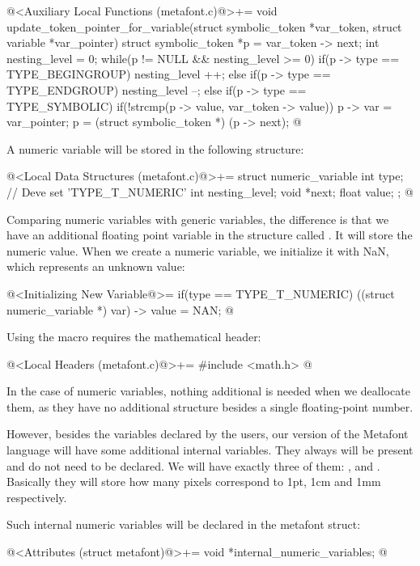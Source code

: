 \iniciocodigo
@<Auxiliary Local Functions (metafont.c)@>+=
void update_token_pointer_for_variable(struct symbolic_token *var_token,
                                      struct variable *var_pointer){
  struct symbolic_token *p = var_token -> next;
  int nesting_level = 0;
  while(p != NULL && nesting_level >= 0){
    if(p -> type == TYPE_BEGINGROUP)
      nesting_level ++;
    else if(p -> type == TYPE_ENDGROUP)
      nesting_level --;
    else if(p -> type == TYPE_SYMBOLIC){
      if(!strcmp(p -> value, var_token -> value)){
        p -> var = var_pointer;
      }
    }
    p = (struct symbolic_token *) (p -> next);
  }
}
@
\fimcodigo


A numeric variable will be stored in the following structure:

\iniciocodigo
@<Local Data Structures (metafont.c)@>+=
struct numeric_variable{
  int type; // Deve set 'TYPE_T_NUMERIC'
  int nesting_level;
  void *next;
  float value;
};
@
\fimcodigo

Comparing numeric variables with generic variables, the difference is
that we have an additional floating point variable in the structure
called . It will store the numeric value. When we
create a numeric variable, we initialize it with NaN, which represents
an unknown value:

\iniciocodigo
@<Initializing New Variable@>=
if(type == TYPE_T_NUMERIC){
  ((struct numeric_variable *) var) -> value = NAN;
}
@
\fimcodigo

Using the macro  requires the mathematical header:

\iniciocodigo
@<Local Headers (metafont.c)@>+=
#include <math.h>
@
\fimcodigo

In the case of numeric variables, nothing additional is needed when we
deallocate them, as they have no additional structure besides a single
floating-point number.

However, besides the variables declared by the users, our version of
the Metafont language will have some additional internal
variables. They always will be present and do not need to be
declared. We will have exactly three of
them: ,  and . Basically
they will store how many pixels correspond to 1pt, 1cm and 1mm
respectively.

Such internal numeric variables will be declared in the metafont
struct:

\iniciocodigo
@<Attributes (struct metafont)@>+=
void *internal_numeric_variables;
@
\fimcodigo

